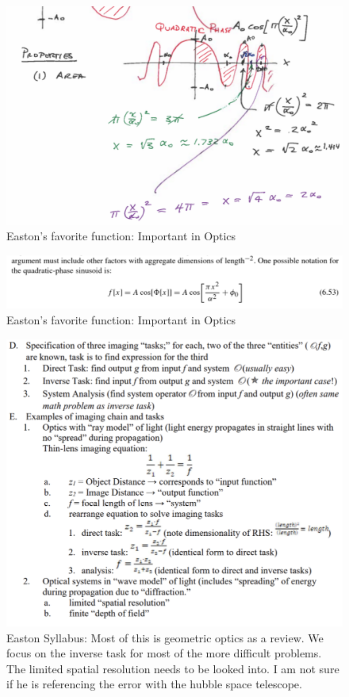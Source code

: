 \documentclass{article}
\begin{document}
\begin{figure}[h!]
\centering
\includegraphics[scale=.65]{Fourier/Week 1/Notes/QuadPhase.png}
\caption{Easton's favorite function: Important in Optics}
\label{fig:QuadPhase}
\end{figure}

\begin{figure}[h!]
\centering
\includegraphics[scale=.65]{Fourier/Week 1/Notes/QuadPhaseEQ.png}
\caption{Easton's favorite function: Important in Optics}
\label{fig:QuadPhas1e}
\end{figure}

\begin{figure}[h!]
\centering
\includegraphics[scale=.60]{Fourier/Week 1/Week1.2.png}
\caption{Easton Syllabus: Most of this is geometric optics as a review. We focus on the inverse task for most of the more difficult problems. The limited spatial resolution needs to be looked into. I am not sure if he is referencing the error with the hubble space telescope.}
\label{fig:Snowman}
\end{figure}
\end{document}
